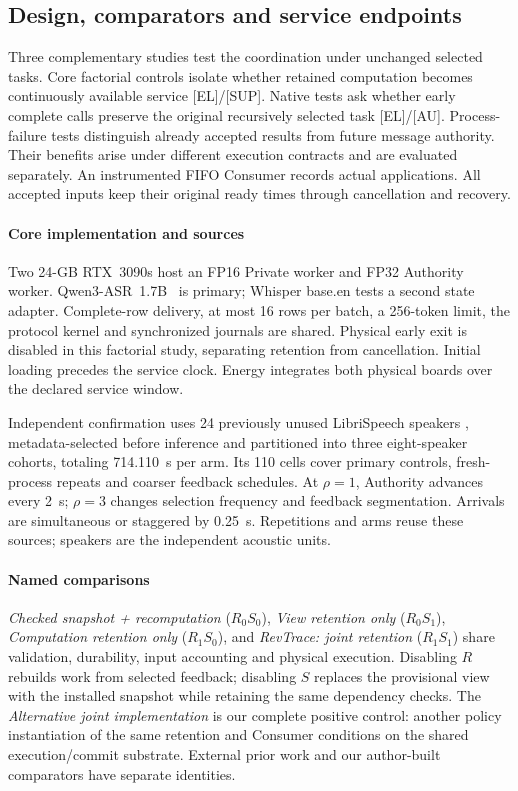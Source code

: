\subsection{Design, comparators and service endpoints}
Three complementary studies test the coordination under unchanged
selected tasks. Core factorial controls isolate whether retained
computation becomes continuously available service [EL]/[SUP]. Native
tests ask whether early complete calls preserve the original recursively
selected task [EL]/[AU]. Process-failure tests distinguish already
accepted results from future message authority. Their benefits arise
under different execution contracts and are evaluated separately.
An instrumented FIFO Consumer records actual applications. All accepted
inputs keep their original ready times through cancellation and recovery.

\paragraph{Core implementation and sources}
Two 24-GB RTX~3090s host an FP16 Private worker and FP32 Authority worker.
Qwen3-ASR~1.7B~\cite{shi2026qwen3asr} is primary; Whisper base.en
\cite{radford2023whisper} tests a second state adapter. Complete-row
delivery, at most 16 rows per batch, a 256-token limit, the protocol kernel
and synchronized journals are shared. Physical early exit is disabled
in this factorial study, separating retention from cancellation.
Initial loading precedes the service clock. Energy integrates both
physical boards over the declared service window.

Independent confirmation uses 24 previously unused LibriSpeech speakers
\cite{panayotov2015librispeech}, metadata-selected before inference and
partitioned into three eight-speaker cohorts, totaling 714.110~s per arm.
Its 110 cells cover primary controls, fresh-process repeats and coarser
feedback schedules. At $\rho=1$, Authority advances every 2~s;
$\rho=3$ changes selection frequency and feedback segmentation. Arrivals
are simultaneous or staggered by 0.25~s. Repetitions and arms reuse these
sources; speakers are the independent acoustic units.

\paragraph{Named comparisons}
\emph{Checked snapshot + recomputation} ($R_0S_0$), \emph{View retention
only} ($R_0S_1$), \emph{Computation retention only} ($R_1S_0$), and
\emph{RevTrace: joint retention} ($R_1S_1$) share validation, durability,
input accounting and physical execution. Disabling $R$ rebuilds work
from selected feedback; disabling $S$ replaces the provisional view
with the installed snapshot while retaining the same dependency checks.
The \emph{Alternative joint implementation} is our complete positive
control: another policy instantiation of the same retention and Consumer
conditions on the shared execution/commit substrate. External prior work
and our author-built comparators have separate identities.

